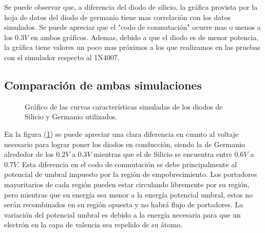 \documentclass[chaptersright]{informeutn}
\begin{document}
        Se puede observar que, a diferencia del diodo de silicio, la gráfica provista por la hoja de datos del diodo de
        germanio \cite{DS1} tiene mas correlación con los datos simulados. Se puede apreciar que el "codo de
        conmutación" ocurre mas o menos a los $0.3V$ en ambos gráficos. Ademas, debido a que el diodo es de menor
        potencia, la gráfica tiene valores un poco mas próximos a los que realizamos en las pruebas con el simulador
        respecto al 1N4007.

      \subsection{Comparación de ambas simulaciones}

        \begin{figure}[!ht]
          \centering
          \caption{Gráfico de las curvas características simuladas de los diodos de Silicio y Germanio utilizados.}
          \label{graph.simulation.comparativa.directa}
        \end{figure}

        En la figura (\ref{graph.simulation.comparativa.directa}) se puede apreciar una clara diferencia en cuanto al voltaje
        necesario para lograr poner los diodos en conducción, siendo la de Germanio alrededor de los $0.2V$ a $0.3V$
        mientras que el de Silicio se encuentra entre $0.6V$ a $0.7V$. Esta diferencia en el codo de conmutación se
        debe principalmente al potencial de umbral impuesto por la región de empobrecimiento. Los portadores
        mayoritarios de cada región pueden estar circulando libremente por su región, pero mientras que su energía
        sea menor a la energía potencial umbral, estos no serán recombinados en su región opuesta y no habrá flujo de
        portadores. La variación del potencial umbral es debido a la energía necesaria para que un electrón en la capa
        de valencia sea repelido de su átomo.
\end{document}
